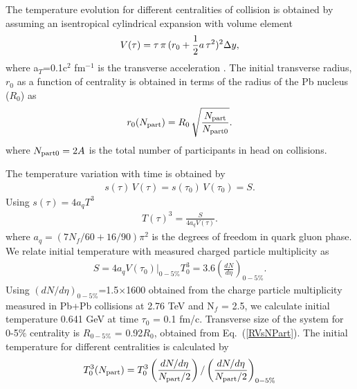 \documentclass[aps,prc,preprint,superscriptaddress,showpacs,showkeys]{revtex4-1}
\begin{document}
 The temperature evolution for different centralities of collision is obtained by 
assuming an isentropical cylindrical expansion with volume element
\begin{equation}
V(\tau) = \tau\,\pi\,(r_0 + {1\over 2} a \, \tau^2 )^{2}\Delta y,
\end{equation}
 where a$_T$=0.1c$^2$ fm$^{-1}$ is the transverse acceleration \cite{RAPc}.
 The initial transverse radius, $r_0$ as a function of centrality is 
obtained in terms of the radius of the Pb nucleus ($R_{0}$) as
\begin{equation}
r_0(N_{\rm part}) = R_0 \, \sqrt{N_{\rm part} \over N_{\rm part0} }.
\label{RVsNPart}
\end{equation}
where $N_{\rm part0} = 2A$ is the total number of participants in head on collisions.

The temperature variation with time is obtained by  
\begin{eqnarray}
s(\tau)\,V(\tau)= s(\tau_0)\,V(\tau_0)=S. 
\end{eqnarray}
Using $s(\tau)=4a_qT^3$ 
\begin{eqnarray}
T(\tau)^{3} = \frac{S}{4a_qV(\tau)}.
\end{eqnarray}
where $a_{q} = (7N_f/60 + 16/90)\pi^2$ is the degrees of freedom in quark gluon phase.
We relate initial temperature with measured charged particle multiplicity as
\begin{eqnarray}
S = 4a_qV(\tau_0)|_{0-5\%} T_{0}^{3} =3.6\left(\frac{dN}{d\eta}\right)_{0-5\%}. 
\label{TempVsMult}
\end{eqnarray}  
Using $(dN/d\eta)_{0-5\%}$=1.5$\times$1600 obtained from the charge particle multiplicity measured in 
Pb+Pb collisions at 2.76 TeV \cite{MULT} and N$_f$ = 2.5, we calculate initial temperature
0.641 GeV at time $\tau_0$ = 0.1 fm/c.
Transverse size of the system for 0-5$\%$ centrality is $R_{0-5\%}$ = 0.92$R_0$,
 obtained from Eq.~(\ref{RVsNPart}). 
The initial temperature for different centralities is calculated by 
\begin{equation}
T_{0}^{3}({N_{\rm part}})=T_{0}^{3}\left(\frac{dN/d\eta}{N_{\rm part}/2}\right)/\left(\frac{dN/d\eta}{N_{\rm part}/2}\right)_{0-5\%}
\label{TempNpart}
\end{equation}




\end{document}
